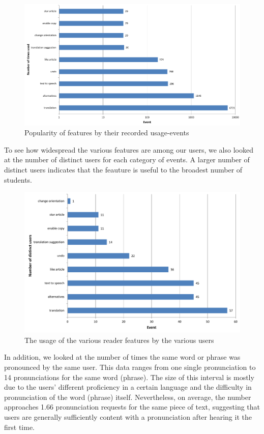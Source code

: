 \begin{figure}[h!]
\centering
  \includegraphics[width=\columnwidth]{figures/reader_feature_usage}
  \caption{Popularity of features by their recorded usage-events}
  \label{fig:feature_usage}
\end{figure}

To see how widespread the various features are among our users, we also looked at the number of distinct users for each category of events. A larger number of distinct users indicates that the feauture is useful to the broadest number of students.

\begin{figure}[h!]
\centering
  \includegraphics[width=\columnwidth]{figures/reader_feature_usage_per_user}
  \caption{The usage of the various reader features by the various users }
\end{figure}

In addition, we looked at the number of times the same word or phrase was pronounced by the same user. This data ranges from one single pronunciation to 14 pronunciations for the same word (phrase). The size of this interval is mostly due to the users' different proficiency in a certain language and the difficulty in pronunciation of the word (phrase) itself. Nevertheless, on average, the number approaches 1.66 pronunciation requests for the same
piece of text, suggesting that users are generally sufficiently content with a pronunciation after hearing it the first time.



